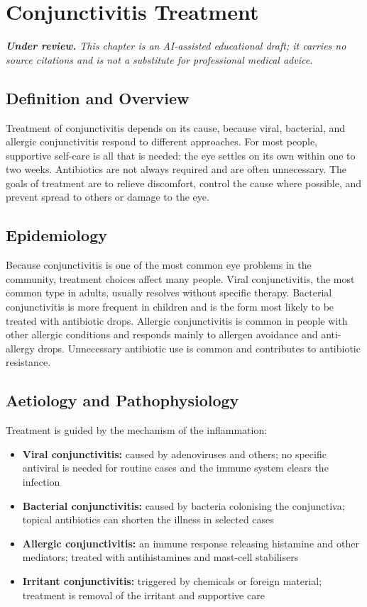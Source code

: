\chapter{Conjunctivitis Treatment}

\medskip
\noindent\textit{\textbf{Under review.} This chapter is an AI-assisted educational draft; it carries no source citations and is not a substitute for professional medical advice.}

\section*{Definition and Overview}
Treatment of conjunctivitis depends on its cause, because viral, bacterial, and allergic conjunctivitis respond to different approaches. For most people, supportive self-care is all that is needed: the eye settles on its own within one to two weeks. Antibiotics are not always required and are often unnecessary. The goals of treatment are to relieve discomfort, control the cause where possible, and prevent spread to others or damage to the eye.

\section*{Epidemiology}
Because conjunctivitis is one of the most common eye problems in the community, treatment choices affect many people. Viral conjunctivitis, the most common type in adults, usually resolves without specific therapy. Bacterial conjunctivitis is more frequent in children and is the form most likely to be treated with antibiotic drops. Allergic conjunctivitis is common in people with other allergic conditions and responds mainly to allergen avoidance and anti-allergy drops. Unnecessary antibiotic use is common and contributes to antibiotic resistance.

\section*{Aetiology and Pathophysiology}
Treatment is guided by the mechanism of the inflammation:
\begin{itemize}
    \item \textbf{Viral conjunctivitis:} caused by adenoviruses and others; no specific antiviral is needed for routine cases and the immune system clears the infection
    \item \textbf{Bacterial conjunctivitis:} caused by bacteria colonising the conjunctiva; topical antibiotics can shorten the illness in selected cases
    \item \textbf{Allergic conjunctivitis:} an immune response releasing histamine and other mediators; treated with antihistamines and mast-cell stabilisers
    \item \textbf{Irritant conjunctivitis:} triggered by chemicals or foreign material; treatment is removal of the irritant and supportive care
\end{itemize}

